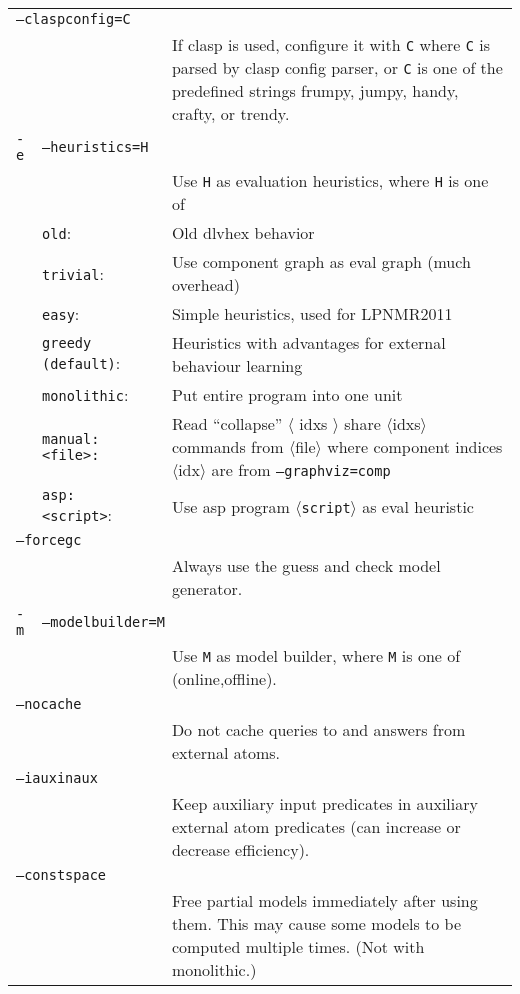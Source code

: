 \documentclass[a4paper, titlepage]{article}
\begin{document}
\begin{center}
\begin{longtable}{p{0.7cm}  p{2.2cm} p{0.3cm} p{6.3cm}  }
\multicolumn{4}{l}{\texttt{--claspconfig=C}}\\
& & & If clasp is used, configure it with \texttt{C} where \texttt{C} is parsed by clasp config parser, or \texttt{C} is one of the predefined strings frumpy, jumpy, handy, crafty, or trendy.\\
\texttt{-e}& \multicolumn{3}{l}{\texttt{--heuristics=H}}\\
& & & Use \texttt{H} as evaluation heuristics, where \texttt{H} is one of\\
&\texttt{old}:&&Old dlvhex behavior\\
&\texttt{trivial}:&&Use component graph as eval graph (much overhead)\\
&\texttt{easy}:&&Simple heuristics, used for LPNMR2011\\
&\texttt{greedy (default)}:&& Heuristics with advantages for external behaviour learning\\
&\texttt{monolithic}:&& Put entire program into one unit\\
&\texttt{manual:<file>:} &&  Read ``collapse'' $\langle$ idxs $\rangle$ share $\langle$idxs$\rangle$ commands from $\langle$file$\rangle$ where component indices $\langle$idx$\rangle$ are from \texttt{--graphviz=comp}\\
&\texttt{asp:<script>}:&&Use asp program $\langle$\texttt{script}$\rangle$ as eval heuristic\\
\multicolumn{4}{l}{\texttt{--forcegc}}\\
& & & Always use the guess and check model generator.\\
\texttt{-m}& \multicolumn{3}{l}{\texttt{--modelbuilder=M}}\\
& & & Use \texttt{M} as model builder, where \texttt{M} is one of (online,offline).\\
\multicolumn{4}{l}{\texttt{--nocache}}\\
& & &Do not cache queries to and answers from external atoms.\\
\multicolumn{4}{l}{\texttt{--iauxinaux}}\\
& & &Keep auxiliary input predicates in auxiliary external atom predicates (can increase or decrease efficiency).\\
\multicolumn{4}{l}{\texttt{--constspace}}\\
& & &Free partial models immediately after using them. This may cause some models to be computed multiple times. (Not with monolithic.)\\
\end{longtable}
\end{center}
\end{document}
